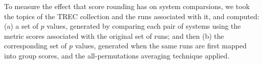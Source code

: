 To measure the effect that score rounding has on system comparsions,
we took the {} topics of the {} TREC collection
and the {} runs associated with it, and computed: (a) a set
of $p$ values, generated by comparing each pair of systems using the
metric scores associated with the original set of runs; and then (b)
the corresponding set of $p$ values, generated when the same runs are
first mapped into group scores, and the all-permutations averaging
technique applied.

